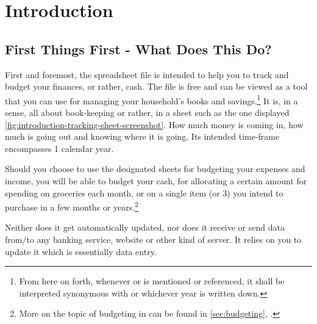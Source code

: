 \section{Introduction}
\label{sec:introduction}

\subsection{First Things First - What Does This Do?}
\label{subsec:first-things-first}

First and foremost, the spreadsheet file  is intended to help you to track and budget your finances, or rather, cash.
The file is free and can be viewed as a tool that you can use for managing your household's books and savings.\footnote{From here on forth, whenever  or \begriff{\tfn} is mentioned or referenced, it shall be interpreted synonymous with  or whichever year is written down.}
It is, in a sense, all about book-keeping or rather,  in a sheet such as the one displayed \autoref{fig:introduction-tracking-sheet-screenshot}.
How much money is coming in, how much is going out and knowing where it is going.
Its intended time-frame encompasses 1 calendar year.


\begin{comment}
\begin{figure}[htp]
	\centering
	\caption[Screenshot of the Tracking Sheet named \sheetname{Groceries}]{Screenshot of the Tracking Sheet \sheetname{Groceries}.
	d0f8934zsd.
	The values and therefor the diagrams are fake and engineered to make up some kind of scenario for the sake of the screenshot.}
	\label{fig:introduction-tracking-sheet-screenshot}
\end{figure}
\end{comment}

Should you choose to use the designated sheets for budgeting your expenses and income, you will be able to budget your cash, \eg for allocating a certain amount for spending on groceries each month, or on a single item (or 3) you intend to purchase in a few months or years.\footnote{More on the topic of budgeting in \tfn can be found in \autoref{sec:budgeting}, .}


Neither does it get automatically updated, nor does it receive or send data from/to any banking service, website or other kind of server.
It relies on you to update it which is essentially data entry.

